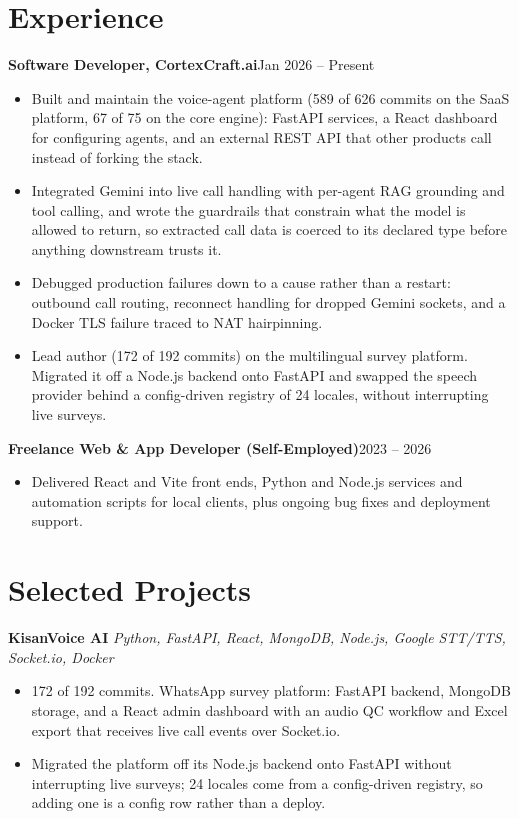 \documentclass[10pt,a4paper]{article}
\newcommand{\entry}[2]{\textbf{#1}\hfill{#2}\par}
\begin{document}
\section{Experience}
\entry{Software Developer, CortexCraft.ai}{Jan 2026 -- Present}
\begin{itemize}
  \item Built and maintain the voice-agent platform (589 of 626 commits on the SaaS platform, 67 of 75
        on the core engine): FastAPI services, a React dashboard for configuring agents, and an
        external REST API that other products call instead of forking the stack.
  \item Integrated Gemini into live call handling with per-agent RAG grounding and tool calling, and
        wrote the guardrails that constrain what the model is allowed to return, so extracted call
        data is coerced to its declared type before anything downstream trusts it.
  \item Debugged production failures down to a cause rather than a restart: outbound call routing,
        reconnect handling for dropped Gemini sockets, and a Docker TLS failure traced to NAT
        hairpinning.
  \item Lead author (172 of 192 commits) on the multilingual survey platform. Migrated it off a
        Node.js backend onto FastAPI and swapped the speech provider behind a config-driven registry
        of 24 locales, without interrupting live surveys.
\end{itemize}

\vspace{1pt}
\entry{Freelance Web \& App Developer (Self-Employed)}{2023 -- 2026}
\begin{itemize}
  \item Delivered React and Vite front ends, Python and Node.js services and automation scripts for
        local clients, plus ongoing bug fixes and deployment support.
\end{itemize}

\section{Selected Projects}
\textbf{KisanVoice AI} \textit{Python, FastAPI, React, MongoDB, Node.js, Google STT/TTS, Socket.io, Docker}
\begin{itemize}
  \item 172 of 192 commits. WhatsApp survey platform: FastAPI backend, MongoDB storage, and a React
        admin dashboard with an audio QC workflow and Excel export that receives live call events
        over Socket.io.
  \item Migrated the platform off its Node.js backend onto FastAPI without interrupting live surveys;
        24 locales come from a config-driven registry, so adding one is a config row rather than a
        deploy.
\end{itemize}
\end{document}
